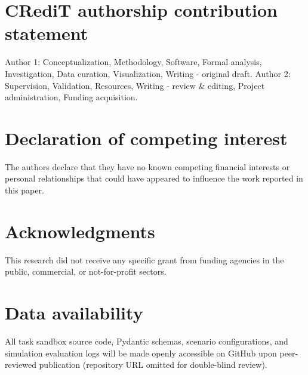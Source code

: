 \documentclass[preprint,12pt]{elsarticle}
\begin{document}
\section*{CRediT authorship contribution statement}
Author 1: Conceptualization, Methodology, Software, Formal analysis, Investigation, Data curation, Visualization, Writing - original draft. Author 2: Supervision, Validation, Resources, Writing - review \& editing, Project administration, Funding acquisition.

\section*{Declaration of competing interest}
The authors declare that they have no known competing financial interests or personal relationships that could have appeared to influence the work reported in this paper.

\section*{Acknowledgments}
This research did not receive any specific grant from funding agencies in the public, commercial, or not-for-profit sectors.

\section*{Data availability}
All task sandbox source code, Pydantic schemas, scenario configurations, and simulation evaluation logs will be made openly accessible on GitHub upon peer-reviewed publication (repository URL omitted for double-blind review).


{\sloppy}
\end{document}
